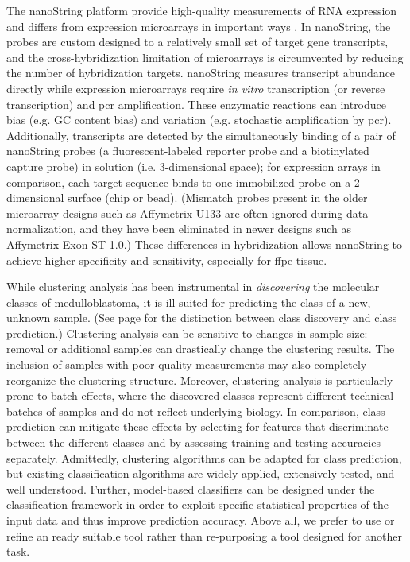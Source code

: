 The nanoString platform provide high-quality measurements of RNA expression and differs from expression microarrays in important ways . In nanoString, the probes are custom designed to a relatively small set of target gene transcripts, and the cross-hybridization limitation of microarrays is circumvented by reducing the number of hybridization targets. nanoString measures transcript abundance directly while expression microarrays require \emph{in vitro} transcription (or reverse transcription) and \gls{pcr} amplification. These enzymatic reactions can introduce bias (e.g. GC content bias) and variation (e.g. stochastic amplification by \gls{pcr}). Additionally, transcripts are detected by the simultaneously binding of a pair of nanoString probes (a fluorescent-labeled reporter probe and a biotinylated capture probe) in solution (i.e. 3-dimensional space); for expression arrays in comparison, each target sequence binds to one immobilized probe on a 2-dimensional surface (chip or bead). (Mismatch probes present in the older microarray designs such as Affymetrix U133 are often ignored during data normalization, and they have been eliminated in newer designs such as Affymetrix Exon ST 1.0.) These differences in hybridization allows nanoString to achieve higher specificity and sensitivity, especially for \gls{ffpe} tissue.

While clustering analysis has been instrumental in \emph{discovering} the molecular classes of medulloblastoma, it is ill-suited for predicting the class of a new, unknown sample. (See page \pageref{sec:classification} for the distinction between class discovery and class prediction.)  Clustering analysis can be sensitive to changes in sample size: removal or additional samples can drastically change the clustering results. The inclusion of samples with poor quality measurements may also completely reorganize the clustering structure. Moreover, clustering analysis is particularly prone to batch effects, where the discovered classes represent different technical batches of samples and do not reflect underlying biology. In comparison, class prediction can mitigate these effects by selecting for features that discriminate between the different classes and by assessing training and testing accuracies separately. Admittedly, clustering algorithms can be adapted for class prediction, but existing classification algorithms are widely applied, extensively tested, and well understood. Further, model-based classifiers can be designed under the classification framework in order to exploit specific statistical properties of the input data and thus improve prediction accuracy. Above all, we prefer to use or refine an ready suitable tool rather than re-purposing a tool designed for another task.


